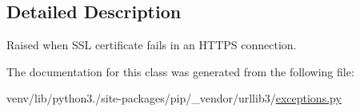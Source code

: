\subsection{Detailed Description}
\begin{DoxyVerb}Raised when SSL certificate fails in an HTTPS connection.\end{DoxyVerb}
 

The documentation for this class was generated from the following file\+:\begin{DoxyCompactItemize}
\item 
venv/lib/python3./site-\/packages/pip/\+\_\+vendor/urllib3/\hyperlink{pip_2__vendor_2urllib3_2exceptions_8py}{exceptions.\+py}\end{DoxyCompactItemize}
